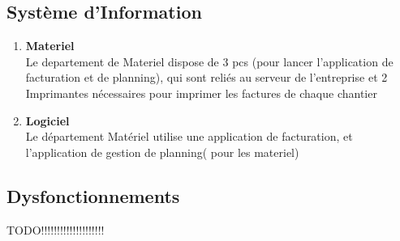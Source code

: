 \documentclass [a4paper] {report}
\begin{document}
\subsection{Système d'Information}
\begin{enumerate}

\item  \textbf{Materiel}\\

Le departement de Materiel dispose de 3 pcs (pour lancer l'application de facturation et de planning), qui sont reliés au serveur de l'entreprise et 2 Imprimantes nécessaires pour imprimer les factures de chaque chantier\\

\item  \textbf{ Logiciel}\\

Le département Matériel utilise une application de facturation, et l'application de gestion de planning( pour les materiel)\\
\end{enumerate}

\subsection{Dysfonctionnements}

TODO!!!!!!!!!!!!!!!!!!!!
\end{document}
